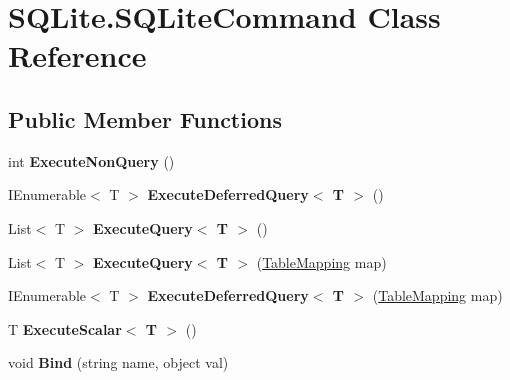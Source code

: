 \hypertarget{classSQLite_1_1SQLiteCommand}{\section{S\-Q\-Lite.\-S\-Q\-Lite\-Command Class Reference}
\label{classSQLite_1_1SQLiteCommand}
}
\subsection*{Public Member Functions}
\begin{DoxyCompactItemize}
\item 
\hypertarget{classSQLite_1_1SQLiteCommand_a7a2b9afd67f691520b73bfb0efb18b9b}{int {\bfseries Execute\-Non\-Query} ()}\label{classSQLite_1_1SQLiteCommand_a7a2b9afd67f691520b73bfb0efb18b9b}

\item 
\hypertarget{classSQLite_1_1SQLiteCommand_a28f64ff5f495468d9f480bd5d1b4338d}{I\-Enumerable$<$ T $>$ {\bfseries Execute\-Deferred\-Query$<$ T $>$} ()}\label{classSQLite_1_1SQLiteCommand_a28f64ff5f495468d9f480bd5d1b4338d}

\item 
\hypertarget{classSQLite_1_1SQLiteCommand_a6aa1993738e35a863eea4c5d7cee212e}{List$<$ T $>$ {\bfseries Execute\-Query$<$ T $>$} ()}\label{classSQLite_1_1SQLiteCommand_a6aa1993738e35a863eea4c5d7cee212e}

\item 
\hypertarget{classSQLite_1_1SQLiteCommand_a89a1919e9f583731eaabaf12e1982e39}{List$<$ T $>$ {\bfseries Execute\-Query$<$ T $>$} (\hyperlink{classSQLite_1_1TableMapping}{Table\-Mapping} map)}\label{classSQLite_1_1SQLiteCommand_a89a1919e9f583731eaabaf12e1982e39}

\item 
\hypertarget{classSQLite_1_1SQLiteCommand_a092913169afcc6c9fdd9ae5e5ca7cf96}{I\-Enumerable$<$ T $>$ {\bfseries Execute\-Deferred\-Query$<$ T $>$} (\hyperlink{classSQLite_1_1TableMapping}{Table\-Mapping} map)}\label{classSQLite_1_1SQLiteCommand_a092913169afcc6c9fdd9ae5e5ca7cf96}

\item 
\hypertarget{classSQLite_1_1SQLiteCommand_a3ce415ca55779eaf3d1851060eff05cc}{T {\bfseries Execute\-Scalar$<$ T $>$} ()}\label{classSQLite_1_1SQLiteCommand_a3ce415ca55779eaf3d1851060eff05cc}

\item 
\hypertarget{classSQLite_1_1SQLiteCommand_adc2e4047e52cc3da0307a74e74e276f7}{void {\bfseries Bind} (string name, object val)}\label{classSQLite_1_1SQLiteCommand_adc2e4047e52cc3da0307a74e74e276f7}


\end{DoxyCompactItemize}
